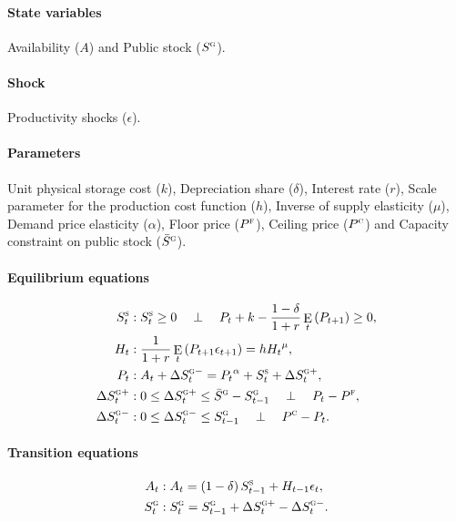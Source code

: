 \documentclass[11pt,fleqn]{article}
\DeclareMathOperator{\E}{E}
\newcommand{\Ss}{S^{\textsc{s}}}
\newcommand{\Sg}{S^{\textsc{g}}}
\newcommand{\PF}{P^{\textsc{f}}}
\newcommand{\Sgb}{\bar{S}^{\textsc{g}}}
\newcommand{\PC}{P^{\textsc{c}}}
\newcommand{\CP}{\quad \perp \quad}
\newcommand{\dSp}[1]{\Delta S^{\textsc{g}+}_{#1}}
\newcommand{\dSm}[1]{\Delta S^{\textsc{g}-}_{#1}}
\begin{document}
\paragraph{State variables}
\label{sec:state-variable}

Availability ($A$) and Public stock ($\Sg$).

\paragraph{Shock}
\label{sec:shock}

Productivity shocks ($\epsilon$).

\paragraph{Parameters}
\label{sec:parameters}

Unit physical storage cost ($k$), Depreciation share ($\delta$), Interest rate
($r$), Scale parameter for the production cost function ($h$), Inverse of supply
elasticity ($\mu$), Demand price elasticity ($\alpha$), Floor price ($\PF$),
Ceiling price ($\PC$) and Capacity constraint on public stock ($\Sgb$).

\paragraph{Equilibrium equations}
\label{sec:equil-equat}

\begin{align}
  \Ss_{t}&: \Ss_{t}\ge 0 \CP P_{t}+k-\frac{1-\delta}{1+r}\E_{t}\left(P_{t+1}\right)\ge 0,\\
  H_{t}&: \frac{1}{1+r}\E_{t}\left(P_{t+1}\epsilon_{t+1}\right)=h {H_{t}}^{\mu},\\
  P_{t}&: A_{t}+\dSm{t}={P_{t}}^{\alpha}+\Ss_{t}+\dSp{t},\\
  \dSp{t}&:0\le\dSp{t}\le\Sgb-\Sg_{t-1} \CP P_{t}-\PF,\\
  \dSm{t}&:0\le\dSm{t}\le\Sg_{t-1} \CP \PC-P_{t}.
\end{align}

\paragraph{Transition equations}
\label{sec:transition-equation}

\begin{align}
  A_{t}&: A_{t}=\left(1-\delta\right)\Ss_{t-1}+H_{t-1}\epsilon_{t},\\
  \Sg_{t}&: \Sg_{t}= \Sg_{t-1}+\dSp{t}-\dSm{t}.
\end{align}
\end{document}
